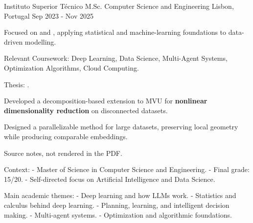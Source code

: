 \begin{cventries}

  \cventry
    {Instituto Superior Técnico} %
    {M.Sc. Computer Science and Engineering} %
    {Lisbon, Portugal} %
    {Sep 2023 - Nov 2025} %
    {
      \begin{cvitems}
        \item {Focused on  and , applying statistical and machine-learning foundations to data-driven modelling.}
        \item {Relevant Coursework: Deep Learning, Data Science, Multi-Agent Systems, Optimization Algorithms, Cloud Computing.}
        \item {Thesis: .
          \begin{cvitems}
            \item {Developed a decomposition-based extension to MVU for \textbf{nonlinear dimensionality reduction} on disconnected datasets.}
            \item {Designed a parallelizable method for large datasets, preserving local geometry while producing comparable embeddings.}
          \end{cvitems}
        }
      \end{cvitems}
    } %
    {
      Source notes, not rendered in the PDF.

      Context:
      - Master of Science in Computer Science and Engineering.
      - Final grade: 15/20.
      - Self-directed focus on Artificial Intelligence and Data Science.

      Main academic themes:
      - Deep learning and how LLMs work.
      - Statistics and calculus behind deep learning.
      - Planning, learning, and intelligent decision making.
      - Multi-agent systems.
      - Optimization and algorithmic foundations.

}
\end{cventries}
